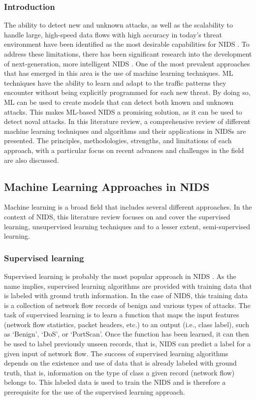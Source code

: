 \subsubsection{Introduction} 
The ability to detect new and unknown attacks, as well as the scalability to handle large, high-speed data flows with high accuracy in today's threat environment have been identified as the most desirable capabilities for NIDS \parencite {agrawal2021survey}. To address these limitations, there has been significant research into the development of next-generation, more intelligent NIDS \parencite {aldhubaib2024network}. One of the most prevalent approaches that has emerged in this area is the use of machine learning techniques. ML techniques have the ability to learn and adapt to the traffic patterns they encounter without being explicitly programmed for each new threat. By doing so, ML can be used to create models that can detect both known and unknown attacks. This makes ML-based NIDS a promising solution, as it can be used to detect noval attacks. In this literature review, a comprehensive review of different machine learning techniques and algorithms and their applications in NIDSs are presented. The principles, methodologies, strengths, and limitations of each approach, with a particular focus on recent advances and challenges in the field are also discussed.

\subsection{Machine Learning Approaches in NIDS} 
Machine learning is a broad field that includes several different approaches. In the context of NIDS, this literature review focuses on and cover the supervised learning, unsupervised learning techniques and to a lesser extent, semi-supervised learning. 


\subsubsection{Supervised learning} 
Supervised learning is probably the most popular approach in NIDS \parencite {aldhubaib2024network}. As the name implies, supervised learning algorithms are provided with training data that is labeled with ground truth information. In the case of NIDS, this training data is a collection of network flow records of benign and various types of attacks. The task of supervised learning is to learn a function that maps the input features (network flow statistics, packet headers, etc.) to an output (i.e., class label), such as ‘Benign', ‘DoS', or ‘PortScan'. Once the function has been learned, it can then be used to label previously unseen records, that is, NIDS can predict a label for a given input of network flow. The success of supervised learning algorithms depends on the existence and use of data that is already labeled with ground truth, that is, information on the type of class a given record (network flow) belongs to. This labeled data is used to train the NIDS and is therefore a prerequisite for the use of the supervised learning approach.

